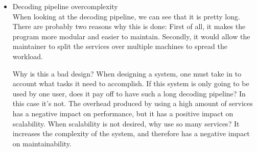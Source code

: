 \documentclass[12pt]{article}
\begin{document}
\begin{itemize}
\item Decoding pipeline overcomplexity\\
When looking at the decoding pipeline, we can see that it is pretty long. There are probably two reasons why this is done: First of all, it makes the program more modular and easier to maintain. Secondly, it would allow the maintainer to split the services over multiple machines to spread the workload.

Why is this a bad design?
When designing a system, one must take in to account what tasks it need to accomplish. If this system is only going to be used by one user, does it pay off to have such a long decoding pipeline? In this case it's not. The overhead produced by using a high amount of services has a negative impact on performance, but it has a positive impact on scalability. When scalability is not desired, why use so many services? It increases the complexity of the system, and therefore has a negative impact on maintainability.
\end{itemize}
\end{document}
